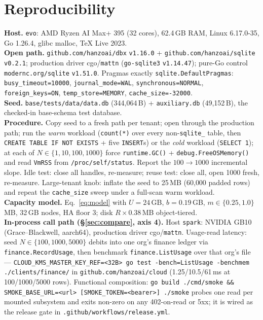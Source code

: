 \documentclass[11pt]{article}
\begin{document}
\section{Reproducibility}
\label{sec:repro}
\sloppy
\textbf{Host.} \texttt{evo}: AMD Ryzen AI Max+ 395 (32 cores), 62.4\,GB RAM, Linux 6.17.0-35,
Go 1.26.4, glibc malloc, TeX Live 2023.\\
\textbf{Open path.} \texttt{github.com/hanzoai/dbx} \texttt{v1.16.0} +
\texttt{github.com/hanzoai/sqlite} \texttt{v0.2.1}; production driver cgo/\texttt{mattn}
(\texttt{go-sqlite3} \texttt{v1.14.47}); pure-Go control \texttt{modernc.org/sqlite}
\texttt{v1.51.0}. Pragmas exactly \texttt{sqlite.DefaultPragmas}:
\texttt{busy\_timeout=10000}, \texttt{journal\_mode=WAL},
\texttt{synchronous=NORMAL}, \texttt{foreign\_keys=ON},
\texttt{temp\_store=MEMORY}, \texttt{cache\_size=-32000}.\\
\textbf{Seed.} \texttt{base/tests/data/data.db} (344{,}064\,B) + \texttt{auxiliary.db}
(49{,}152\,B), the checked-in base-schema test database.\\
\textbf{Procedure.} Copy seed to a fresh path per tenant; open through the production path; run
the \emph{warm} workload (\texttt{count(*)} over every non-\texttt{sqlite\_} table, then
\texttt{CREATE TABLE IF NOT EXISTS} + five \texttt{INSERT}s) or the \emph{cold} workload
(\texttt{SELECT 1}); at each of $N \in \{1,10,100,1000\}$ force \texttt{runtime.GC()} +
\texttt{debug.FreeOSMemory()} and read \texttt{VmRSS} from \texttt{/proc/self/status}. Report the
$100\rightarrow1000$ incremental slope. Idle test: close all handles, re-measure; reuse test:
close all, open 1000 fresh, re-measure. Large-tenant knob: inflate the seed to 25\,MB
(60{,}000 padded rows) and repeat the \texttt{cache\_size} sweep under a full-scan warm workload.\\
\textbf{Capacity model.} Eq.~\ref{eq:model} with $U=24$\,GB, $b=0.19$\,GB, $m\in\{0.25,1.0\}$\,MB,
32\,GB nodes, HA floor 3; disk $R\times0.38$\,MB object-tiered.\\
\textbf{In-process call path (\S\ref{sec:compare}, axis 4).} Host \texttt{spark}: NVIDIA GB10
(Grace--Blackwell, aarch64), production driver cgo/\texttt{mattn}. Usage-read latency: seed
$N\in\{100,1000,5000\}$ debits into one org's finance ledger via \texttt{finance.RecordUsage},
then benchmark \texttt{finance.ListUsage} over that org's file ---
\texttt{CLOUD\_KMS\_MASTER\_KEY\_REF=<32B> go test -bench=ListUsage -benchmem
./clients/finance/} in \texttt{github.com/hanzoai/cloud} (1.25/10.5/61\,ms at 100/1000/5000
rows). Functional composition: \texttt{go build ./cmd/smoke \&\& SMOKE\_BASE\_URL=<url>
[SMOKE\_TOKEN=<bearer>] ./smoke} probes one read per mounted subsystem and exits non-zero on any
402-on-read or 5xx; it is wired as the release gate in
\texttt{.github/workflows/release.yml}.
\end{document}
